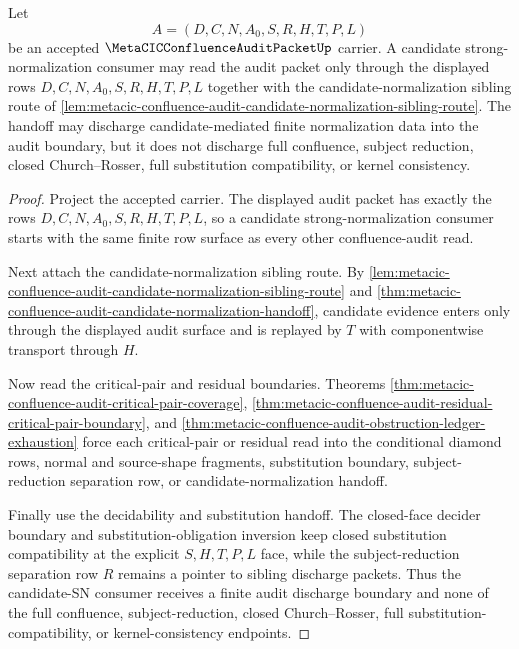 \begin{theorem}
\label{thm:metacic-confluence-audit-packet-candidate-sn-discharge}
Let
$$
A=(D,C,N,A_0,S,R,H,T,P,L)
$$
be an accepted $\MetaCICConfluenceAuditPacketUp$ carrier. A candidate strong-normalization consumer may read the audit packet only through the displayed rows $D,C,N,A_0,S,R,H,T,P,L$ together with the candidate-normalization sibling route of \autoref{lem:metacic-confluence-audit-candidate-normalization-sibling-route}. The handoff may discharge candidate-mediated finite normalization data into the audit boundary, but it does not discharge full confluence, subject reduction, closed Church--Rosser, full substitution compatibility, or kernel consistency.
\end{theorem}
\begin{proof}
Project the accepted carrier. The displayed audit packet has exactly the rows $D,C,N,A_0,S,R,H,T,P,L$, so a candidate strong-normalization consumer starts with the same finite row surface as every other confluence-audit read.

Next attach the candidate-normalization sibling route. By \autoref{lem:metacic-confluence-audit-candidate-normalization-sibling-route} and \autoref{thm:metacic-confluence-audit-candidate-normalization-handoff}, candidate evidence enters only through the displayed audit surface and is replayed by $T$ with componentwise transport through $H$.

Now read the critical-pair and residual boundaries. Theorems \autoref{thm:metacic-confluence-audit-critical-pair-coverage}, \autoref{thm:metacic-confluence-audit-residual-critical-pair-boundary}, and \autoref{thm:metacic-confluence-audit-obstruction-ledger-exhaustion} force each critical-pair or residual read into the conditional diamond rows, normal and source-shape fragments, substitution boundary, subject-reduction separation row, or candidate-normalization handoff.

Finally use the decidability and substitution handoff. The closed-face decider boundary and substitution-obligation inversion keep closed substitution compatibility at the explicit $S,H,T,P,L$ face, while the subject-reduction separation row $R$ remains a pointer to sibling discharge packets. Thus the candidate-SN consumer receives a finite audit discharge boundary and none of the full confluence, subject-reduction, closed Church--Rosser, full substitution-compatibility, or kernel-consistency endpoints.
\end{proof}
